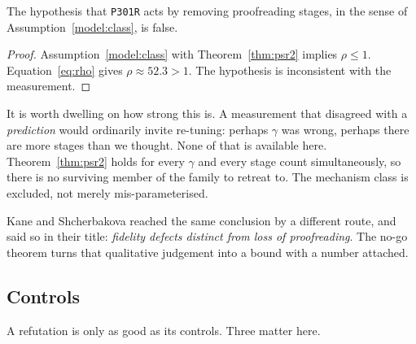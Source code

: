 \begin{theorem}[Refutation]\label{thm:refuted}
The hypothesis that \texttt{P301R} acts by removing proofreading stages, in the
sense of Assumption~\ref{model:class}, is false.
\end{theorem}

\begin{proof}
Assumption~\ref{model:class} with Theorem~\ref{thm:psr2} implies $\rho \le 1$.
Equation~\eqref{eq:rho} gives $\rho \approx 52.3 > 1$. The hypothesis is
inconsistent with the measurement.
\end{proof}

\begin{remark}\label{rem:class}
It is worth dwelling on how strong this is. A measurement that disagreed with a
\emph{prediction} would ordinarily invite re-tuning: perhaps $\gamma$ was wrong,
perhaps there are more stages than we thought. None of that is available here.
Theorem~\ref{thm:psr2} holds for every $\gamma$ and every stage count
simultaneously, so there is no surviving member of the family to retreat to. The
mechanism class is excluded, not merely mis-parameterised.

Kane and Shcherbakova reached the same conclusion by a different route, and said
so in their title: \emph{fidelity defects distinct from loss of proofreading}.
The no-go theorem turns that qualitative judgement into a bound with a number
attached.
\end{remark}

\subsection{Controls}

A refutation is only as good as its controls. Three matter here.

